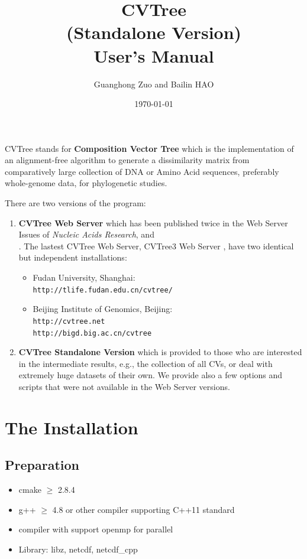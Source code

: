 \documentclass[a4paper,12pt]{article}
\begin{document}
\title{CVTree \\\Large{(Standalone Version)}\\User's Manual}
\author{Guanghong Zuo and Bailin HAO}
\date{\today}
\maketitle


CVTree stands for {\bf Composition Vector Tree} which is the
implementation of an alignment-free algorithm to generate a
dissimilarity matrix from comparatively large collection of DNA or Amino
Acid sequences, preferably whole-genome data, for phylogenetic studies.

There are two versions of the program:
\begin{enumerate}\itemsep 0pt
\item {\bf CVTree Web Server} which has been published twice in the Web
  Server Issues of {\it Nucleic Acids Research}, \cite{qlh04}
  and\\ \cite{xh09}. The lastest CVTree Web Server, CVTree3 Web Server \cite{zh15}, have two identical but independent installations:
  \begin{itemize}
  	\item Fudan University, Shanghai: \\
  	  {\tt http://tlife.fudan.edu.cn/cvtree/} 
  	\item Beijing Institute of Genomics, Beijing:\\
    {\tt http://cvtree.net 
    \\ http://bigd.big.ac.cn/cvtree} 
  \end{itemize}

\item {\bf CVTree Standalone Version} which is provided to those who are
  interested in the intermediate results, e.g., the collection of all
  CVs, or deal with extremely huge datasets of their own. We provide
  also a few options and scripts that were not available in the Web
  Server versions. 
\end{enumerate}


\section{The Installation}
\subsection{Preparation}
\begin{itemize}
	\item cmake $\geq$ 2.8.4
  \item g++ $\geq$ 4.8 or other compiler supporting C++11 standard
  \item compiler with support openmp for parallel
	\item Library: libz, netcdf, netcdf\_cpp
\end{itemize}
\end{document}
